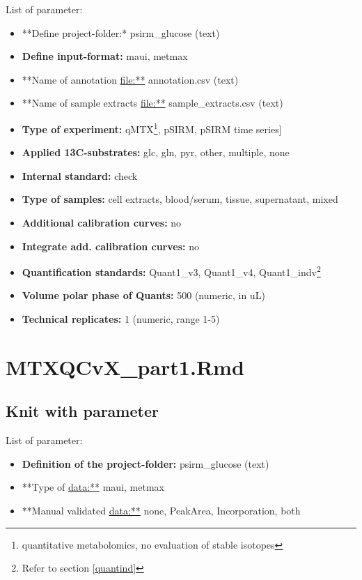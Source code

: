 \documentclass[]{book}
\providecommand{\tightlist}{%
  \setlength{\itemsep}{0pt}\setlength{\parskip}{0pt}}
\let\rmarkdownfootnote\footnote%
\def\footnote{\protect\rmarkdownfootnote}
\theoremstyle{definition}
\theoremstyle{definition}
\theoremstyle{definition}
\theoremstyle{remark}
\begin{document}
List of parameter:

\begin{itemize}
\tightlist
\item
  **Define project-folder:* psirm\_glucose (text)
\item
  \textbf{Define input-format:} maui, metmax
\item
  **Name of annotation \url{file:**} annotation.csv (text)
\item
  **Name of sample extracts \url{file:**} sample\_extracts.csv (text)
\item
  \textbf{Type of experiment:} qMTX\footnote{quantitative metabolomics,
    no evaluation of stable isotopes}, pSIRM, pSIRM time series{]}
\item
  \textbf{Applied 13C-substrates:} glc, gln, pyr, other, multiple, none
\item
  \textbf{Internal standard:} check
\item
  \textbf{Type of samples:} cell extracts, blood/serum, tissue,
  supernatant, mixed
\item
  \textbf{Additional calibration curves:} no
\item
  \textbf{Integrate add. calibration curves:} no
\item
  \textbf{Quantification standards:} Quant1\_v3, Quant1\_v4,
  Quant1\_indv\footnote{Refer to section \ref{quantind}}
\item
  \textbf{Volume polar phase of Quants:} 500 (numeric, in uL)
\item
  \textbf{Technical replicates:} 1 (numeric, range 1-5)
\end{itemize}

\chapter{MTXQCvX\_part1.Rmd}\label{part1}

\section{Knit with parameter}\label{knit-with-parameter-2}

List of parameter:

\begin{itemize}
\tightlist
\item
  \textbf{Definition of the project-folder:} psirm\_glucose (text)
\item
  **Type of \url{data:**} maui, metmax
\item
  **Manual validated \url{data:**} none, PeakArea, Incorporation, both
\end{itemize}
\end{document}
